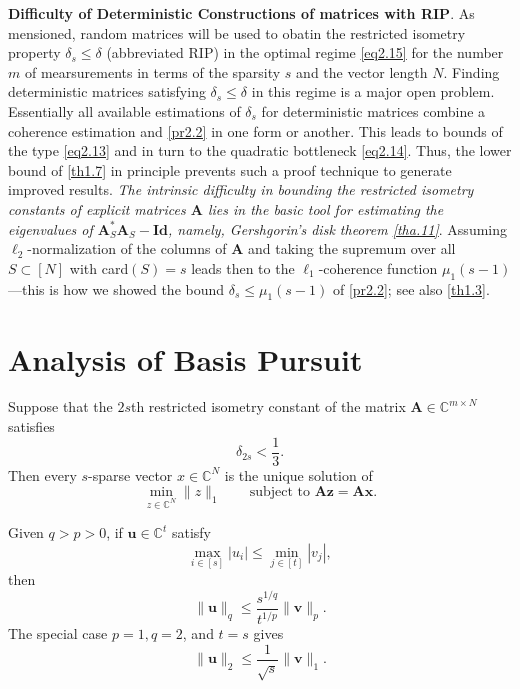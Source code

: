 \textbf{Difficulty of Deterministic Constructions of matrices with RIP}. As mensioned, random matrices will be used to obatin the restricted isometry property $\delta_s \leq \delta$ (abbreviated RIP) in the optimal regime \cref{eq2.15} for the number $m$ of mearsurements in terms of the sparsity $s$ and the vector length $N$. Finding deterministic matrices satisfying $\delta_s \leq \delta$ in this regime is a major open problem. Essentially all available estimations of $\delta_s$ for deterministic matrices combine a coherence estimation and \cref{pr2.2} in one form or another. This leads to bounds of the type \cref{eq2.13} and in turn to the quadratic bottleneck \cref{eq2.14}. Thus, \textcolor[rgb]{1,0,0}{the lower bound of \cref{th1.7} in principle prevents such a proof technique to generate improved results}. \emph{\textcolor[rgb]{1,0,0}{The intrinsic difficulty in bounding the restricted isometry constants of explicit matrices $\mathbf{A}$ lies in the basic tool for estimating the eigenvalues of $\mathbf{A}_S^*\mathbf{A}_S-\mathbf{Id}$, namely, Gershgorin's disk theorem \cref{tha.11}}}. Assuming $\ell_2$-normalization of the columns of $\mathbf{A}$ and taking the supremum over all $S \subset [N]$ with card$(S) = s$ leads then to the $\ell_1$-coherence function $\mu_1(s-1)$---this is how we showed the bound $\delta_s \leq \mu_1(s-1)$ of \cref{pr2.2}; see also \cref{th1.3}.

\section{Analysis of Basis Pursuit}

\begin{theorem}
    \label{th2.9}
    Suppose that the $2s$th restricted isometry constant of the matrix $\mathbf{A} \in \mathbb{C}^{m \times N}$ satisfies 
    \begin{equation}
        \delta_{2s} < \frac{1}{3}. 
        \label{eq2.16}
    \end{equation}
    Then every $s$-sparse vector $x \in \mathbb{C}^{N}$ is the unique solution of 
    \[
        \min\limits_{z \in \mathbb{C}^N} \|z\|_1 \qquad \text{subject to } \mathbf{Az} = \mathbf{Ax}.
    \]
\end{theorem}

\begin{lemma}
    \label{lm2.10}
    Given $q > p >0$, if $\mathbf{u} \in \mathbb{C}^t$ satisfy
    \begin{equation}
        \max\limits_{i \in [s]} \left|u_i\right| \leq \min\limits_{j \in [t]} \left|v_j\right|,
        \label{eq2.17}
    \end{equation}
    then 
    \[
        \|\mathbf{u}\|_q \leq \frac{s^{1/q}}{t^{1/p}} \|\mathbf{v}\|_p.
    \]
    The special case $p=1, q=2$, and $t=s$ gives 
    \[
        \|\mathbf{u}\|_2 \leq \frac{1}{\sqrt{s}} \|\mathbf{v}\|_1.
    \]
\end{lemma}

